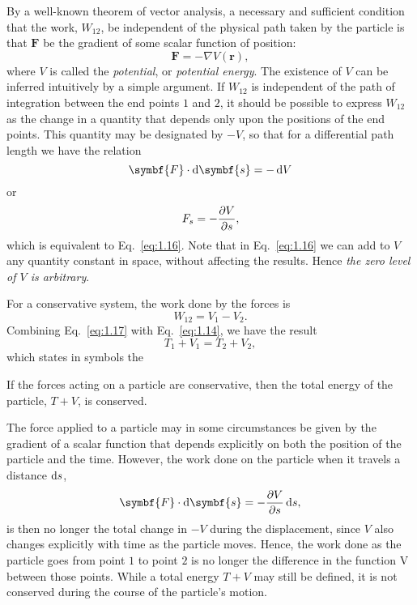 By a well-known theorem of vector analysis, a necessary and sufficient condition that the work, \(W_{12}\), be independent of the physical path taken by the particle is that \(\symbf{F}\) be the gradient of some scalar function of position:
\begin{equation}
    \symbf{F}=-\nabla V\left(\symbf{r}\right),\label{eq:1.16}
\end{equation}
where \(V\) is called the \emph{potential}, or \emph{potential energy}. The existence of \(V\) can be inferred intuitively by a simple argument. If \(W_{12}\) is independent of the path of integration between the end points \(1\) and \(2\), it should be possible to express \(W_{12}\) as the change in a quantity that depends only upon the positions of the end points. This quantity may be designated by \(-V\), so that for a differential path length we have the relation
\begin{equation*}
    \symbf{F}\cdot\odif{\symbf{s}}=-\odif{V}
\end{equation*}
or
\begin{equation*}
    F_s=-\pdv{V}{s},
\end{equation*}
which is equivalent to Eq.~\eqref{eq:1.16}. Note that in Eq.~\eqref{eq:1.16} we can add to \(V\) any quantity constant in space, without affecting the results. Hence \emph{the zero level of \(V\) is arbitrary}.

For a conservative system, the work done by the forces is
\begin{equation}
    W_{12}=V_1-V_2.\label{eq:1.17}
\end{equation}
Combining Eq.~\eqref{eq:1.17} with Eq.~\eqref{eq:1.14}, we have the result
\begin{equation}
    T_1+V_1=T_2+V_2,\label{eq:1.18}
\end{equation}
which states in symbols the
\begin{theorem}
    If the forces acting on a particle are conservative, then the total energy of the particle, \(T+V\), is conserved.
\end{theorem}

The force applied to a particle may in some circumstances be given by the gradient of a scalar function that depends explicitly on both the position of the particle and the time. However, the work done on the particle when it travels a distance \(\odif{s}\),
\begin{equation*}
    \symbf{F}\cdot\odif{\symbf{s}}=-\pdv{V}{s}\odif{s},
\end{equation*}
is then no longer the total change in \(-V\) during the displacement, since \(V\) also changes explicitly with time as the particle moves. Hence, the work done as the particle goes from point \(1\) to point \(2\) is no longer the difference in the function V between those points. While a total energy \(T+V\) may still be defined, it is not conserved during the course of the particle's motion.
